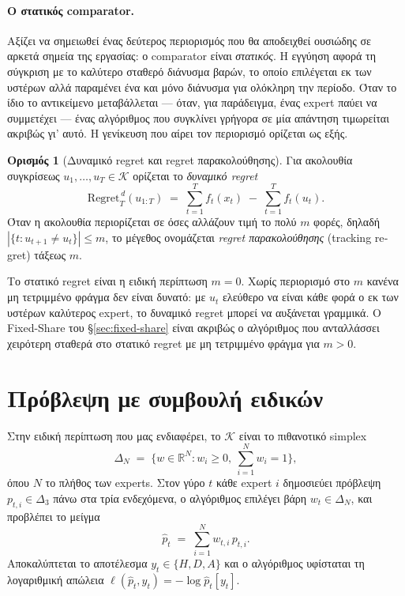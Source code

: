 \documentclass[12pt,a4paper,oneside]{report}
\newcommand{\en}[1]{\textenglish{#1}}
\renewcommand{\_}{\oldunderscore\allowbreak}
\theoremstyle{definition}
\newtheorem{definition}{Ορισμός}[chapter]
\theoremstyle{plain}
\theoremstyle{remark}
\begin{document}
\paragraph{Ο στατικός comparator.} Αξίζει να σημειωθεί ένας δεύτερος περιορισμός που θα
αποδειχθεί ουσιώδης σε αρκετά σημεία της εργασίας: ο comparator είναι \emph{στατικός}. Η
εγγύηση αφορά τη σύγκριση με το καλύτερο σταθερό διάνυσμα βαρών, το οποίο επιλέγεται εκ των
υστέρων αλλά παραμένει ένα και μόνο διάνυσμα για ολόκληρη την περίοδο. Όταν το ίδιο το
αντικείμενο μεταβάλλεται --- όταν, για παράδειγμα, ένας expert παύει να συμμετέχει --- ένας
αλγόριθμος που συγκλίνει γρήγορα σε μία απάντηση τιμωρείται ακριβώς γι' αυτό. Η γενίκευση
που αίρει τον περιορισμό ορίζεται ως εξής.

\begin{definition}[Δυναμικό regret και regret παρακολούθησης]
\label{def:dynamic-regret}
Για ακολουθία συγκρίσεως $u_1,\dots,u_T \in \mathcal{K}$ ορίζεται το \emph{δυναμικό regret}
\[
\mathrm{Regret}_T^{\,d}(u_{1:T}) \;=\; \sum_{t=1}^{T} f_t(x_t) \;-\; \sum_{t=1}^{T} f_t(u_t).
\]
Όταν η ακολουθία περιορίζεται σε όσες αλλάζουν τιμή το πολύ $m$ φορές, δηλαδή
$|\{t : u_{t+1}\neq u_t\}| \leq m$, το μέγεθος ονομάζεται \emph{regret παρακολούθησης}
(\en{tracking regret}) τάξεως $m$.
\end{definition}

Το στατικό regret είναι η ειδική περίπτωση $m=0$. Χωρίς περιορισμό στο $m$ κανένα μη
τετριμμένο φράγμα δεν είναι δυνατό: με $u_t$ ελεύθερο να είναι κάθε φορά ο εκ των υστέρων
καλύτερος expert, το δυναμικό regret μπορεί να αυξάνεται γραμμικά. Ο Fixed-Share του
\S\ref{sec:fixed-share} είναι ακριβώς ο αλγόριθμος που ανταλλάσσει χειρότερη σταθερά στο
στατικό regret με μη τετριμμένο φράγμα για $m>0$.

\section{Πρόβλεψη με συμβουλή ειδικών}

Στην ειδική περίπτωση που μας ενδιαφέρει, το $\mathcal{K}$ είναι το πιθανοτικό simplex
\[
\Delta_N \;=\; \Big\{ w \in \mathbb{R}^N : w_i \geq 0,\ \textstyle\sum_{i=1}^{N} w_i = 1 \Big\},
\]
όπου $N$ το πλήθος των experts. Στον γύρο $t$ κάθε expert $i$ δημοσιεύει πρόβλεψη
$p_{t,i} \in \Delta_3$ πάνω στα τρία ενδεχόμενα, ο αλγόριθμος επιλέγει βάρη
$w_t \in \Delta_N$, και προβλέπει το μείγμα
\[
\hat{p}_t \;=\; \sum_{i=1}^{N} w_{t,i}\, p_{t,i}.
\]
Αποκαλύπτεται το αποτέλεσμα $y_t \in \{H,D,A\}$ και ο αλγόριθμος υφίσταται τη λογαριθμική
απώλεια $\ell(\hat{p}_t, y_t) = -\log \hat{p}_{t}[y_t]$.
\end{document}
